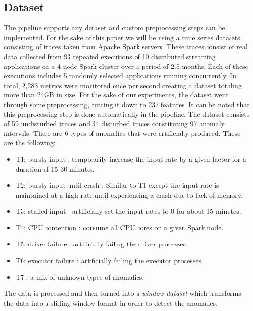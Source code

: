 \documentclass[oneside, a4paper, onecolumn, 11pt]{article}
\begin{document}
\subsection{Dataset}
The pipeline supports any dataset and custom preprocessing steps can be implemented. For the sake of this paper we will be using a time series datasets consisting of traces taken from Apache Spark servers. These traces consist of real data collected from 93 repeated executions of 10 distributed streaming applications on a 4-node Spark cluster over a period of 2.5 months. Each of these executions includes 5 randomly selected applications running concurrently. In total, 2,283 metrics were monitored once per second creating a dataset totaling more than 24GB in size. For the sake of our experiments, the dataset went through some preprocessing, cutting it down to 237 features. It can be noted that this preprocessing step is done automatically in the pipeline.
The dataset consists of 59 undisturbed traces and 34 disturbed traces constituting 97 anomaly intervals. There are 6 types of anomalies that were artificially produced. These are the following: 
\begin{itemize}
    \item T1: bursty input : temporarily increase the input rate by a given factor for a duration of 15-30 minutes.
    \item T2: bursty input until crash : Similar to T1 except the input rate is maintained at a high rate until experiencing a crash due to lack of memory.
    \item T3: stalled input : artificially set the input rates to 0 for about 15 minutes.
    \item T4: CPU contention : consume all CPU cores on a given Spark
    node.
    \item T5: driver failure : artificially failing the driver processes.
    \item T6: executor failure : artificially failing the executor processes.
    \item T7 : a mix of unknown types of anomalies.
\end{itemize}
The data is processed and then turned into a \textit{window dataset} which transforms the data into a sliding window format in order to detect the anomalies.
\end{document}
